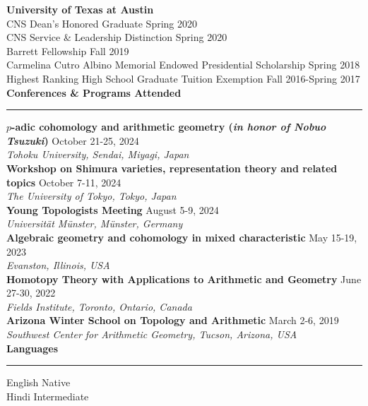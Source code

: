 \documentclass[11pt]{article}
\newenvironment{mysection}{
\color{mygreen}\bfseries\large
}
{
\\ \rule{\textwidth}{1pt}\hspace{-.25em}
} %
\begin{document}
\textbf{University of Texas at Austin} \\
CNS Dean's Honored Graduate \hfill Spring 2020 \\
CNS Service \& Leadership Distinction \hfill Spring 2020 \\
Barrett Fellowship \hfill Fall 2019 \\
Carmelina Cutro Albino Memorial Endowed Presidential Scholarship \hfill Spring 2018 \\
Highest Ranking High School Graduate Tuition Exemption \hfill Fall 2016-Spring 2017 \\

\begin{mysection}Conferences \& Programs Attended\end{mysection}
\textbf{$p$-adic cohomology and arithmetic geometry (\emph{in honor of Nobuo Tsuzuki})} \hfill October 21-25, 2024 \\
\emph{Tohoku University, Sendai, Miyagi, Japan} \\
\textbf{Workshop on Shimura varieties, representation theory and related topics} \hfill October 7-11, 2024 \\
\emph{The University of Tokyo, Tokyo, Japan} \\
\textbf{Young Topologists Meeting} \hfill August 5-9, 2024 \\
\emph{Universit\"{a}t M\"{u}nster, M\"{u}nster, Germany} \\
\textbf{Algebraic geometry and cohomology in mixed characteristic} \hfill May 15-19, 2023 \\
\emph{Evanston, Illinois, USA} \\
\textbf{Homotopy Theory with Applications to Arithmetic and Geometry} \hfill June 27-30, 2022 \\
\emph{Fields Institute, Toronto, Ontario, Canada} \\
\textbf{Arizona Winter School on Topology and Arithmetic} \hfill March 2-6, 2019 \\
\emph{Southwest Center for Arithmetic Geometry, Tucson, Arizona, USA} \\

\begin{mysection}Languages\end{mysection}
English \hfill Native \\
Hindi \hfill Intermediate \\
\end{document}
